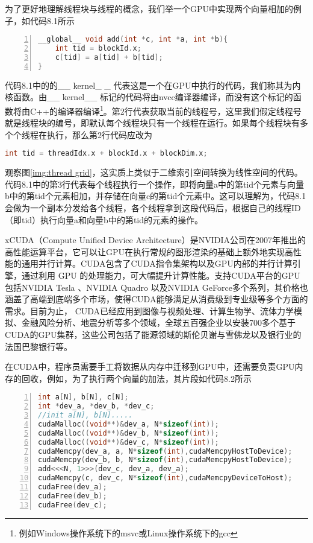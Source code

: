 为了更好地理解线程块与线程的概念，我们举一个GPU中实现两个向量相加的例子，如代码8.1所示

\begin{lstlisting}[language=C, numbers=left, frame=shadowbox, rulesepcolor=\color{cadegrey}, caption=\text{向量加法内核函数}]
__global__ void add(int *c, int *a, int *b){
	int tid = blockId.x;
	c[tid] = a[tid] + b[tid];
}
\end{lstlisting}

代码8.1中的的\_\_ kernel\_ \_ 代表这是一个在GPU中执行的代码，我们称其为内核函数。由\_\_ kernel\_\_ 标记的代码将由nvcc编译器编译，而没有这个标记的函数将由C++的编译器编译\footnote{例如Windows操作系统下的msvc或Linux操作系统下的gcc}。第2行代表获取当前的线程号，这里我们假定线程号就是线程块的编号，即默认每个线程块只有一个线程在运行。如果每个线程块有多个个线程在执行，那么第2行代码应改为

\begin{lstlisting}[language=C, frame=shadowbox, rulesepcolor=\color{cadegrey}]
int tid = threadIdx.x + blockId.x + blockDim.x;
\end{lstlisting}

观察图\ref{img:thread grid}，这实质上类似于二维索引空间转换为线性空间的代码。代码8.1中的第3行代表每个线程执行一个操作，即将向量a中的第tid个元素与向量b中的第tid个元素相加，并存储在向量c的第tid个元素中。这可以理解为，代码8.1会做为一个副本分发给各个线程，各个线程拿到这段代码后，根据自己的线程ID（即tid）执行向量a和向量b中的第tid的元素的操作。


xCUDA（Compute Unified Device Architecture）是NVIDIA公司在2007年推出的高性能运算平台，它可以让GPU在执行常规的图形渲染的基础上额外地实现高性能的通用并行计算。CUDA包含了CUDA指令集架构以及GPU内部的并行计算引擎，通过利用 GPU 的处理能力，可大幅提升计算性能。支持CUDA平台的GPU包括NVIDIA Tesla 、NVIDIA Quadro 以及NVIDIA GeForce多个系列，其价格也涵盖了高端到底端多个市场，使得CUDA能够满足从消费级到专业级等多个方面的需求。目前为止， CUDA已经应用到图像与视频处理、计算生物学、流体力学模拟、金融风险分析、地震分析等多个领域，全球五百强企业以安装700多个基于CUDA的GPU集群，这些公司包括了能源领域的斯伦贝谢与雪佛龙以及银行业的法国巴黎银行等。

在CUDA中，程序员需要手工将数据从内存中迁移到GPU中，还需要负责GPU内存的回收，例如，为了执行两个向量的加法，其片段如代码8.2所示

\begin{lstlisting}[language=C, numbers=left, frame=shadowbox, rulesepcolor=\color{cadegrey}, caption=\text{GPU中向量加法的调用过程}]
int a[N], b[N], c[N];
int *dev_a, *dev_b, *dev_c;
//init a[N], b[N].....
cudaMalloc((void**)&dev_a, N*sizeof(int));
cudaMalloc((void**)&dev_b, N*sizeof(int));
cudaMalloc((void**)&dev_c, N*sizeof(int));
cudaMemcpy(dev_a, a, N*sizeof(int),cudaMemcpyHostToDevice);
cudaMemcpy(dev_b, b, N*sizeof(int),cudaMemcpyHostToDevice);
add<<<N, 1>>>(dev_c, dev_a, dev_a);	
cudaMemcpy(c, dev_c, N*sizeof(int),cudaMemcpyDeviceToHost);
cudaFree(dev_a);
cudaFree(dev_b);
cudaFree(dev_c);
\end{lstlisting}

